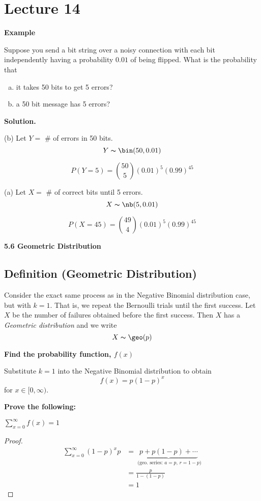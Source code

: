 \section{Lecture 14}
\textbf{Example}

Suppose you send a bit string over a noisy connection with
each bit independently having a probability $ 0.01 $ of being
flipped. What is the probability that
\begin{enumerate}[(a)]
    \item it takes 50 bits to get 5 errors?
    \item a 50 bit message has 5 errors?
\end{enumerate}

\textbf{Solution.}

(b) Let $ Y= $ \# of errors in 50 bits. 
\[ Y\thicksim\bin(50,0.01) \]

\[ P(Y=5)=\binom{50}{5}(0.01)^5(0.99)^{45} \]

(a) Let $ X= $ \# of correct bits until 5 errors.
\[ X\thicksim\nb(5,0.01) \]

\[ P(X=45)=\binom{49}{4}(0.01)^5(0.99)^{45} \]

\textbf{5.6 Geometric Distribution}

\begin{defbox}
    \subsection{Definition (Geometric Distribution)}
    Consider the exact same process as in the Negative Binomial distribution
    case, but with $ k=1 $. That is, we repeat the Bernoulli trials until
    the first success. Let $ X $ be the number of failures obtained before
    the first success. Then $ X $ has a \emph{Geometric distribution}
    and we write
    \[ X \thicksim \geo(p) \]
\end{defbox}

\textbf{Find the probability function, $ f(x)$}

Substitute $ k=1 $ into the Negative Binomial distribution to obtain
\[ f(x)=p(1-p)^x \]
for $ x\in[0,\infty) $.

\textbf{Prove the following:}

$ \sum\limits_{x=0}^{\infty} f(x) = 1$

\begin{proof}
    \begin{align*}
        \sum\limits_{x=0}^{\infty} (1-p)^x p
         & =\underbrace{p+p(1-p)+\cdots}_
        \text{ (geo. series: $a=p$, $r=1-p$)} \\
         & =\frac{p}{1-(1-p)}                 \\
         & =1
    \end{align*}
\end{proof}

